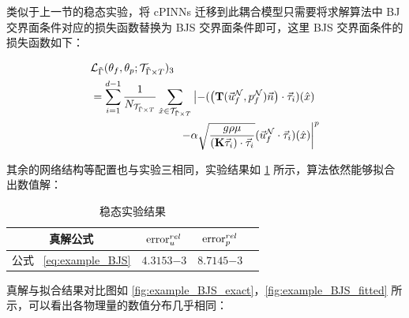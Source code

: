 类似于上一节的稳态实验，将 cPINNs 迁移到此耦合模型只需要将求解算法中 BJ 交界面条件对应的损失函数替换为 BJS 交界面条件即可，这里 BJS 交界面条件的损失函数如下：

\begin{equation}
    \begin{aligned}
        &\mathcal{L}_{\tilde{\Gamma}}({\theta_f,\theta_p};{\mathcal{T}_{{\tilde{\Gamma}} \times T}})_{3} \\
        &= \sum_{i=1}^{d-1} 
            \frac{1}{N_{\mathcal{T}_{{\tilde{\Gamma}} \times T}}} \sum_{\substack{\hat{x} \in \mathcal{T}_{{\tilde{\Gamma}} \times T}}}
            \left|
                -(\left(\mathbf{T}(\vec{u}_f^{\mathcal{N}},p_f^{\mathcal{N}}) \vec{n} \right) \cdot \vec{\tau}_i)(\hat{x})
            \right.\\
            &\hspace*{8em} \left. - \alpha \sqrt{\frac{g \rho \mu}{(\mathbf{K} \vec{\tau}_i) \cdot \vec{\tau}_i}} (\vec{u}_f^{\mathcal{N}} \cdot \vec{\tau}_i)(\hat{x})
            \right|^{p}
    \end{aligned}
\end{equation}

其余的网络结构等配置也与实验三相同，实验结果如 \ref{tab:example_BJS} 所示，算法依然能够拟合出数值解：

\begin{table}[H]
    \centering
    \caption{稳态实验结果}
    \begin{tabular}{cccc}
        \toprule
        真解公式 & $\mathrm{error}^{rel}_{u}$ & $\mathrm{error}^{rel}_{p}$ \\
        \midrule
        公式 ~\eqref{eq:example_BJS}  & $\num{4.3153}{-3}$ & $\num{8.7145}{-3}$ \\
        \bottomrule
    \end{tabular}
    \label{tab:example_BJS}
\end{table}

真解与拟合结果对比图如 \ref{fig:example_BJS_exact}，\ref{fig:example_BJS_fitted} 所示，可以看出各物理量的数值分布几乎相同：

